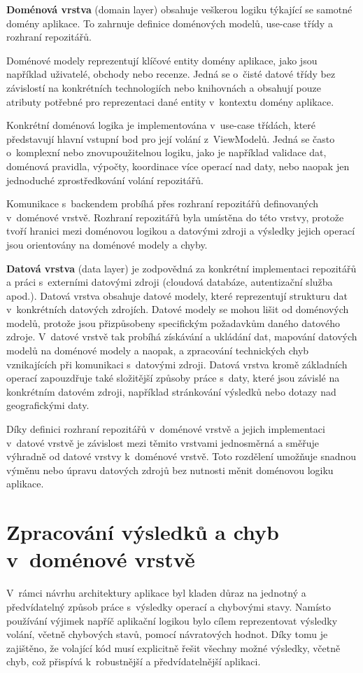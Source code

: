 \textbf{Doménová vrstva} (domain layer) obsahuje veškerou logiku týkající se samotné domény aplikace.
To zahrnuje definice doménových modelů, use-case třídy a rozhraní repozitářů.

Doménové modely reprezentují klíčové entity domény aplikace, jako jsou například uživatelé, obchody nebo recenze.
Jedná se o~čisté datové třídy bez závislostí na konkrétních technologiích nebo knihovnách a obsahují pouze atributy potřebné pro reprezentaci dané entity v~kontextu domény aplikace.

Konkrétní doménová logika je implementována v~use-case třídách, které představují hlavní vstupní bod pro její volání z~ViewModelů.
Jedná se často o~komplexní nebo znovupoužitelnou logiku, jako je například validace dat, doménová pravidla, výpočty, koordinace více operací nad daty, nebo naopak jen jednoduché zprostředkování volání repozitářů.

Komunikace s~backendem probíhá přes rozhraní repozitářů definovaných v~doménové vrstvě.
Rozhraní repozitářů byla umístěna do této vrstvy, protože tvoří hranici mezi doménovou logikou a datovými zdroji a výsledky jejich operací jsou orientovány na doménové modely a chyby.

\textbf{Datová vrstva} (data layer) je zodpovědná za konkrétní implementaci repozitářů a práci s~externími datovými zdroji (cloudová databáze, autentizační služba apod.).
Datová vrstva obsahuje datové modely, které reprezentují strukturu dat v~konkrétních datových zdrojích.
Datové modely se mohou lišit od doménových modelů, protože jsou přizpůsobeny specifickým požadavkům daného datového zdroje.
V~datové vrstvě tak probíhá získávání a ukládání dat, mapování datových modelů na doménové modely a naopak, a zpracování technických chyb vznikajících při komunikaci s~datovými zdroji.
Datová vrstva kromě základních operací zapouzdřuje také složitější způsoby práce s~daty, které jsou závislé na konkrétním datovém zdroji, například stránkování výsledků nebo dotazy nad geografickými daty.

Díky definici rozhraní repozitářů v~doménové vrstvě a jejich implementaci v~datové vrstvě je závislost mezi těmito vrstvami jednosměrná a směřuje výhradně od datové vrstvy k~doménové vrstvě.
Toto rozdělení umožňuje snadnou výměnu nebo úpravu datových zdrojů bez nutnosti měnit doménovou logiku aplikace.


\section[Zpracování výsledků a chyb v~doménové vrstvě]{Zpracování výsledků a chyb v~doménové vrstvě}\label{sec:domain_result}
V~rámci návrhu architektury aplikace byl kladen důraz na jednotný a předvídatelný způsob práce s~výsledky operací a chybovými stavy.
Namísto používání výjimek napříč aplikační logikou bylo cílem reprezentovat výsledky volání, včetně chybových stavů, pomocí návratových hodnot.
Díky tomu je zajištěno, že volající kód musí explicitně řešit všechny možné výsledky, včetně chyb, což přispívá k~robustnější a předvídatelnější aplikaci.

